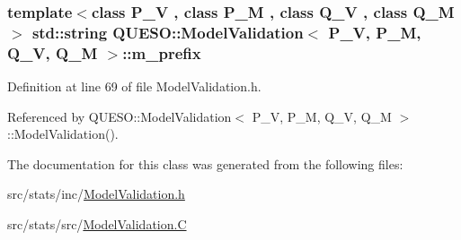 \hypertarget{class_q_u_e_s_o_1_1_model_validation_aa239eb12478d1904e18ffe2ed712630f}{
\subsubsection[{m\-\_\-prefix}]{\setlength{\rightskip}{0pt plus 5cm}template$<$class P\-\_\-\-V , class P\-\_\-\-M , class Q\-\_\-\-V , class Q\-\_\-\-M $>$ std\-::string {\bf Q\-U\-E\-S\-O\-::\-Model\-Validation}$<$ P\-\_\-\-V, P\-\_\-\-M, Q\-\_\-\-V, Q\-\_\-\-M $>$\-::m\-\_\-prefix\hspace{0.3cm}{\ttfamily [protected]}}}\label{class_q_u_e_s_o_1_1_model_validation_aa239eb12478d1904e18ffe2ed712630f}


Definition at line 69 of file Model\-Validation.\-h.



Referenced by Q\-U\-E\-S\-O\-::\-Model\-Validation$<$ P\-\_\-\-V, P\-\_\-\-M, Q\-\_\-\-V, Q\-\_\-\-M $>$\-::\-Model\-Validation().



The documentation for this class was generated from the following files\-:\begin{DoxyCompactItemize}
\item 
src/stats/inc/\hyperlink{_model_validation_8h}{Model\-Validation.\-h}\item 
src/stats/src/\hyperlink{_model_validation_8_c}{Model\-Validation.\-C}\end{DoxyCompactItemize}
